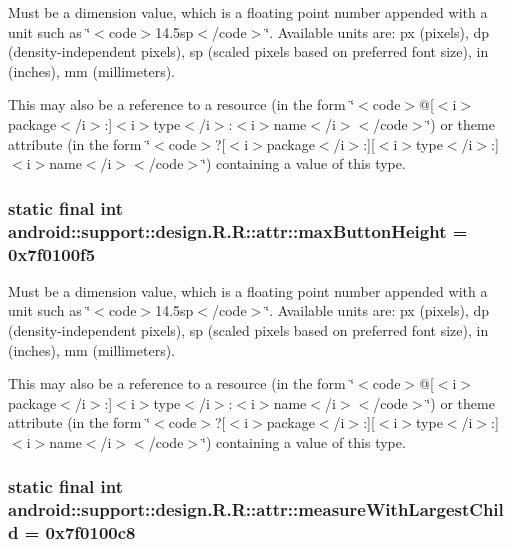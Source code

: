 Must be a dimension value, which is a floating point number appended with a unit such as \char`\"{}$<$code$>$14.5sp$<$/code$>$\char`\"{}. Available units are: px (pixels), dp (density-independent pixels), sp (scaled pixels based on preferred font size), in (inches), mm (millimeters). 

This may also be a reference to a resource (in the form \char`\"{}$<$code$>$@\mbox{[}$<$i$>$package$<$/i$>$:\mbox{]}$<$i$>$type$<$/i$>$:$<$i$>$name$<$/i$>$$<$/code$>$\char`\"{}) or theme attribute (in the form \char`\"{}$<$code$>$?\mbox{[}$<$i$>$package$<$/i$>$:\mbox{]}\mbox{[}$<$i$>$type$<$/i$>$:\mbox{]}$<$i$>$name$<$/i$>$$<$/code$>$\char`\"{}) containing a value of this type. \hypertarget{classandroid_1_1support_1_1design_1_1_r_1_1attr_e3c5d3ed07471d69df0d6d27f2614e63}{
\subsubsection[{maxButtonHeight}]{\setlength{\rightskip}{0pt plus 5cm}static final int android::support::design.R.R::attr::maxButtonHeight = 0x7f0100f5}}
\label{classandroid_1_1support_1_1design_1_1_r_1_1attr_e3c5d3ed07471d69df0d6d27f2614e63}


Must be a dimension value, which is a floating point number appended with a unit such as \char`\"{}$<$code$>$14.5sp$<$/code$>$\char`\"{}. Available units are: px (pixels), dp (density-independent pixels), sp (scaled pixels based on preferred font size), in (inches), mm (millimeters). 

This may also be a reference to a resource (in the form \char`\"{}$<$code$>$@\mbox{[}$<$i$>$package$<$/i$>$:\mbox{]}$<$i$>$type$<$/i$>$:$<$i$>$name$<$/i$>$$<$/code$>$\char`\"{}) or theme attribute (in the form \char`\"{}$<$code$>$?\mbox{[}$<$i$>$package$<$/i$>$:\mbox{]}\mbox{[}$<$i$>$type$<$/i$>$:\mbox{]}$<$i$>$name$<$/i$>$$<$/code$>$\char`\"{}) containing a value of this type. \hypertarget{classandroid_1_1support_1_1design_1_1_r_1_1attr_1d92b39a0363acc517a389fed2acda2a}{
\subsubsection[{measureWithLargestChild}]{\setlength{\rightskip}{0pt plus 5cm}static final int android::support::design.R.R::attr::measureWithLargestChild = 0x7f0100c8}}
\label{classandroid_1_1support_1_1design_1_1_r_1_1attr_1d92b39a0363acc517a389fed2acda2a}


